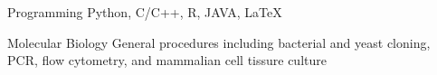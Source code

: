 

\begin{cvskills}

  \cvskill
  {Programming} %
  {Python, C/C++, R, JAVA, LaTeX} %

  \cvskill
  {Molecular Biology} %
  {General procedures including bacterial and yeast cloning, PCR, flow cytometry, and mammalian cell tissure culture} %


\end{cvskills}
